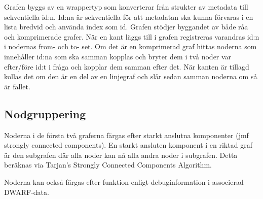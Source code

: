 Grafen byggs av en wrappertyp som konverterar från strukter av
metadata till sekventiella id:n. Id:na är sekventiella för att
metadatan ska kunna förvaras i en lista bredvid och använda index som
id. Grafen stödjer byggandet av både råa och komprimerade grafer. När
en kant läggs till i grafen registreras varandras id:n i nodernas
from- och to- set. Om det är en komprimerad graf hittas noderna som
innehåller id:na som ska samman kopplas och bryter dem i två noder var
efter/före id:t i fråga och kopplar dem samman efter det. När kanten
är tillagd kollas det om den är en del av en linjegraf och slår sedan
samman noderna om så är fallet.

\subsection{Nodgruppering}
Noderna i de första två graferna färgas efter starkt anslutna
komponenter (jmf strongly connected components). En starkt ansluten
komponent i en riktad graf är den subgrafen där alla noder kan nå alla
andra noder i subgrafen. Detta beräknas via Tarjan's
Strongly Connected Components Algorithm.~\cite{tarjan}

Noderna kan också färgas efter funktion enligt debuginformation i
associerad DWARF-data.

